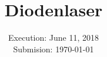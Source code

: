 

\subject{V60}
\title{Diodenlaser}
\date{%
  Execution: June 11, 2018
  \\
  Submision: \today
}



\maketitle
\thispagestyle{empty}
\tableofcontents
\newpage





% 

\printbibliography{}


